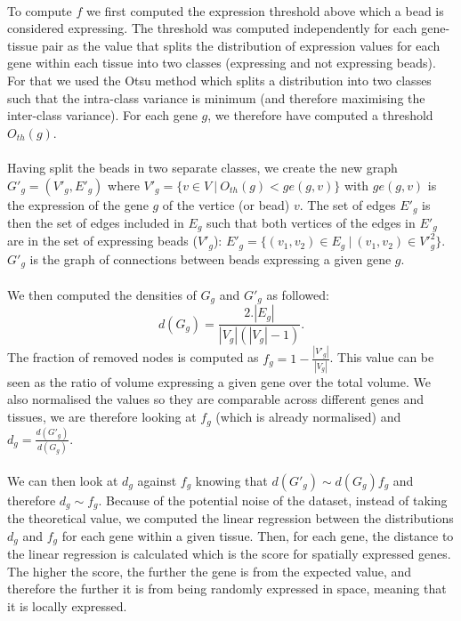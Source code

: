 \documentclass[10pt,a4paper]{article}
\begin{document}
\paragraph{}To compute \(f\) we first computed the expression threshold above which a bead is considered expressing.
The threshold was computed independently for each gene-tissue pair as the value that splits the distribution of expression values for each gene within each tissue into two classes (expressing and not expressing beads).
For that we used the Otsu method \citep{Otsu:1979} which splits a distribution into two classes such that the intra-class variance is minimum (and therefore maximising the inter-class variance).
For each gene \(g\), we therefore have computed a threshold \(O_{th}(g)\).
\paragraph{}Having split the beads in two separate classes, we create the new graph \(G'_{g} = (V'_g, E'_g)\) where \(V'_g=\{v\in V~|~O_{th}(g)<ge(g, v)\}\) with \(ge(g,v)\) is the expression of the gene \(g\) of the vertice (or bead) \(v\).
The set of edges \(E'_g\) is then the set of edges included in \(E_g\) such that both vertices of the edges in \(E'_g\) are in the set of expressing beads (\(V'_g\)): \(E'_g=\{(v_1, v_2) \in E_g~|~(v_1, v_2)\in {V'}_g^{2}\}\).
\(G'_g\) is the graph of connections between beads expressing a given gene \(g\).
\paragraph{}We then computed the densities of \(G_g\) and \(G'_g\) as followed:
\begin{equation}
d(G_g)=\frac{2.|E_g|}{|V_g|(|V_g|-1)}.
\end{equation}
The fraction of removed nodes is computed as \(f_g=1-\frac{|V'_g|}{|V_g|}\).
This value can be seen as the ratio of volume expressing a given gene over the total volume.
We also normalised the values so they are comparable across different genes and tissues, we are therefore looking at \(f_g\) (which is already normalised) and \(d_g=\frac{d(G'_g)}{d(G_g)}\).
\paragraph{}We can then look at \(d_g\) against \(f_g\) knowing that \(d(G'_g)\sim d(G_g)f_g\) and therefore \(d_g\sim f_g\).
Because of the potential noise of the dataset, instead of taking the theoretical value, we computed the linear regression between the distributions \(d_g\) and \(f_g\) for each gene within a given tissue.
Then, for each gene, the distance to the linear regression is calculated which is the score for spatially expressed genes.
The higher the score, the further the gene is from the expected value, and therefore the further it is from being randomly expressed in space, meaning that it is locally expressed.
\end{document}

